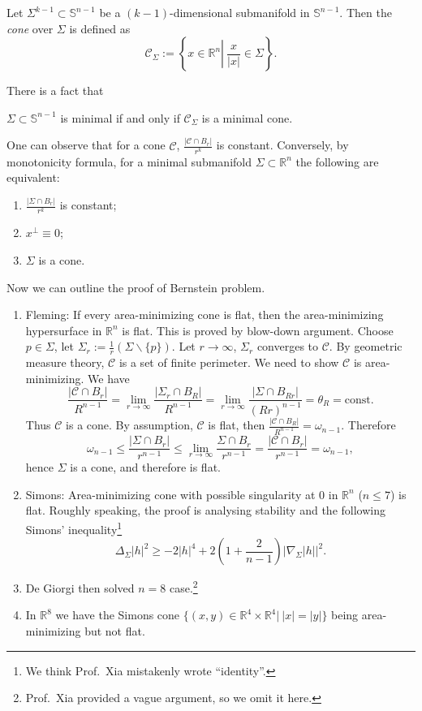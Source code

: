 \begin{defn}
    Let $\Sigma^{k-1}\subset\mathbb{S}^{n-1}$ be a $(k-1)$-dimensional submanifold in $\mathbb{S}^{n-1}$.
    Then the \emph{cone} over $\Sigma$ is defined as
    \[\mathscr{C}_\Sigma:=\left\{x\in\mathbb{R}^n\left|\ \frac{x}{|x|}\in\Sigma\right.\right\}.\]
\end{defn}

There is a fact that
\begin{prop}
    $\Sigma\subset\mathbb{S}^{n-1}$ is minimal if and only if $\mathscr{C}_\Sigma$ is a minimal cone.
\end{prop}

One can observe that for a cone $\mathscr{C}$, $\frac{|\mathscr{C}\cap B_r|}{r^k}$ is constant.
Conversely, by monotonicity formula, for a minimal submanifold $\Sigma\subset\mathbb{R}^n$ the following are equivalent:
\begin{enumerate}[(1)]
    \item $\frac{|\Sigma\cap B_r|}{r^k}$ is constant;
    \item $x^\perp\equiv 0$;
    \item $\Sigma$ is a cone.
\end{enumerate}

Now we can outline the proof of Bernstein problem.
\begin{enumerate}
    \item Fleming:
    If every area-minimizing cone is flat, then the area-minimizing hypersurface in $\mathbb{R}^n$ is flat.
    This is proved by blow-down argument.
    Choose $p\in\Sigma$, let $\Sigma_r:=\frac{1}{r}(\Sigma\backslash\{p\})$.
    Let $r\to\infty$, $\Sigma_r$ converges to $\mathscr{C}$.
    By geometric measure theory, $\mathscr{C}$ is a set of finite perimeter.
    We need to show $\mathscr{C}$ is area-minimizing.
    We have
    \[\frac{|\mathscr{C}\cap B_r|}{R^{n-1}}=\lim_{r\to\infty}\frac{|\Sigma_r\cap B_R|}{R^{n-1}}=\lim_{r\to\infty}\frac{|\Sigma\cap B_{Rr}|}{(Rr)^{n-1}}=\theta_R=\text{const}.\]
    Thus $\mathscr{C}$ is a cone.
    By assumption, $\mathscr{C}$ is flat, then $\frac{|\mathscr{C}\cap B_R|}{R^{n-1}}=\omega_{n-1}$.
    Therefore
    \[\omega_{n-1}\leq\frac{|\Sigma\cap B_r|}{r^{n-1}}\leq\lim_{r\to\infty}\frac{\Sigma\cap B_r}{r^{n-1}}=\frac{|\mathscr{C}\cap B_r|}{r^{n-1}}=\omega_{n-1},\]
    hence $\Sigma$ is a cone, and therefore is flat.
    \item Simons:
    Area-minimizing cone with possible singularity at $0$ in $\mathbb{R}^n$ ($n\leq 7$) is flat.
    Roughly speaking, the proof is analysing stability and the following Simons' inequality\footnote{We think Prof.\ Xia mistakenly wrote ``identity''.}
    \[\Delta_\Sigma|h|^2\geq -2|h|^4+2\left(1+\frac{2}{n-1}\right)|\nabla_\Sigma|h||^2.\]
    \item De Giorgi then solved $n=8$ case.\footnote{Prof.\ Xia provided a vague argument, so we omit it here.}
    \item In $\mathbb{R}^8$ we have the Simons cone $\{(x,y)\in\mathbb{R}^4\times\mathbb{R}^4|\ |x|=|y|\}$ being area-minimizing but not flat.
\end{enumerate}

